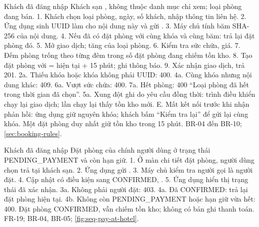 {Khách đã đăng nhập}
{Khách sạn , không thuộc danh mục chỉ xem; loại phòng đang bán.}
{1. Khách chọn loại phòng, ngày, số khách, nhập thông tin liên hệ. 2. Ứng dụng sinh UUID làm  cho nội dung này và gửi . 3. Máy chủ tính băm SHA-256 của nội dung. 4. Nếu đã có đặt phòng với cùng khóa và cùng băm: trả lại đặt phòng đó. 5. Mở giao dịch; tăng  của loại phòng. 6. Kiểm tra sức chứa, giá. 7. Đếm phòng trống theo từng đêm trong số đặt phòng đang chiếm tồn kho. 8. Tạo đặt phòng  với  = hiện tại + 15 phút; ghi thông báo. 9. Xác nhận giao dịch, trả 201.}
{2a. Thiếu khóa hoặc khóa không phải UUID: 400. 4a. Cùng khóa nhưng nội dung khác: 409. 6a. Vượt sức chứa: 400. 7a. Hết phòng: 400 ``Loại phòng đã hết trong thời gian đã chọn''. 5a. Xung đột ghi do yêu cầu đồng thời: trình điều khiển chạy lại giao dịch; lần chạy lại thấy tồn kho mới. E. Mất kết nối trước khi nhận phản hồi: ứng dụng giữ nguyên khóa; khách bấm ``Kiểm tra lại'' để gửi lại cùng khóa.}
{Một đặt phòng duy nhất giữ tồn kho trong 15 phút.}
{BR-04 đến BR-10; \cref{sec:booking-rules}.}

{Khách đã đăng nhập}
{Đặt phòng của chính người dùng ở trạng thái PENDING\_PAYMENT và còn hạn giữ.}
{1. Ở màn chi tiết đặt phòng, người dùng chọn trả tại khách sạn. 2. Ứng dụng gửi . 3. Máy chủ kiểm tra người gọi là người đặt. 4. Cập nhật có điều kiện sang CONFIRMED, . 5. Ứng dụng hiển thị trạng thái đã xác nhận.}
{3a. Không phải người đặt: 403. 4a. Đã CONFIRMED: trả lại đặt phòng hiện tại. 4b. Không còn PENDING\_PAYMENT hoặc hạn giữ vừa hết: 400.}
{Đặt phòng CONFIRMED, vẫn chiếm tồn kho; không có bản ghi thanh toán.}
{FR-19; BR-04, BR-05; \cref{fig:seq-pay-at-hotel}.}

